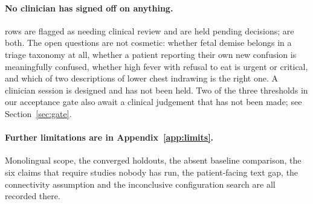 \paragraph{No clinician has signed off on anything.} \CorpusFlagged{} rows are
flagged as needing clinical review and \CorpusHeld{} are held pending decisions;
\CorpusFlaggedAndHeld{} are both.
The open questions are not cosmetic: whether fetal demise belongs in a triage
taxonomy at all, whether a patient reporting their own new confusion is
meaningfully confused, whether high fever with refusal to eat is urgent or
critical, and which of two descriptions of lower chest indrawing is the right
one. A clinician session is designed and has not been held. Two of the three
thresholds in our acceptance gate also await a clinical judgement that has not
been made; see Section~\ref{sec:gate}.

\paragraph{Further limitations are in Appendix~\ref{app:limits}.} Monolingual
scope, the converged holdouts, the absent baseline comparison, the six claims that
require studies nobody has run, the patient-facing text gap, the connectivity
assumption and the inconclusive configuration search are all recorded there.
